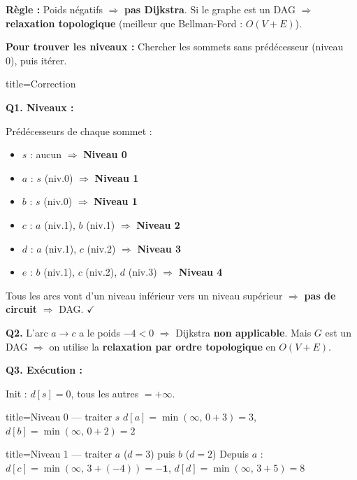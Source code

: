\documentclass[12pt,a4paper]{article}
\begin{document}
\begin{methode}
\textbf{R\`egle :} Poids n\'egatifs $\Rightarrow$ \textbf{pas Dijkstra}. Si le graphe est un DAG $\Rightarrow$ \textbf{relaxation topologique} (meilleur que Bellman-Ford : $O(V+E)$).

\textbf{Pour trouver les niveaux :} Chercher les sommets sans pr\'ed\'ecesseur (niveau 0), puis it\'erer.
\end{methode}

\begin{correction}{title=Correction}

\textbf{Q1. Niveaux :}

Pr\'ed\'ecesseurs de chaque sommet :
\begin{itemize}[nosep]
    \item $s$ : aucun $\Rightarrow$ \textbf{Niveau 0}
    \item $a$ : $s$ (niv.0) $\Rightarrow$ \textbf{Niveau 1}
    \item $b$ : $s$ (niv.0) $\Rightarrow$ \textbf{Niveau 1}
    \item $c$ : $a$ (niv.1), $b$ (niv.1) $\Rightarrow$ \textbf{Niveau 2}
    \item $d$ : $a$ (niv.1), $c$ (niv.2) $\Rightarrow$ \textbf{Niveau 3}
    \item $e$ : $b$ (niv.1), $c$ (niv.2), $d$ (niv.3) $\Rightarrow$ \textbf{Niveau 4}
\end{itemize}

Tous les arcs vont d'un niveau inf\'erieur vers un niveau sup\'erieur $\Rightarrow$ \textbf{pas de circuit} $\Rightarrow$ DAG. $\checkmark$

\medskip
\textbf{Q2.} L'arc $a \to c$ a le poids $-4 < 0$ $\Rightarrow$ Dijkstra \textbf{non applicable}. Mais $G$ est un DAG $\Rightarrow$ on utilise la \textbf{relaxation par ordre topologique} en $O(V+E)$.

\medskip
\textbf{Q3. Ex\'ecution :}

Init : $d[s]=0$, tous les autres $= +\infty$.

\begin{etape}{title=Niveau 0 --- traiter $s$}
$d[a] = \min(\infty,\, 0+3) = 3$, \quad $d[b] = \min(\infty,\, 0+2) = 2$
\end{etape}

\begin{etape}{title=Niveau 1 --- traiter $a$ ($d=3$) puis $b$ ($d=2$)}
Depuis $a$ : $d[c] = \min(\infty,\, 3+(-4)) = \mathbf{-1}$, \quad $d[d] = \min(\infty,\, 3+5) = 8$


\end{etape}
\end{correction}
\end{document}
